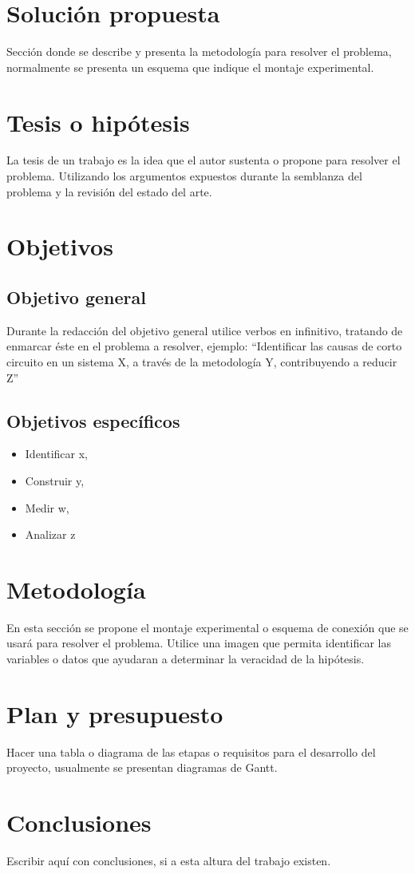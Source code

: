 \documentclass[a4paper, twocolumns]{IEEEtran}
\begin{document}
\section{Solución propuesta}
Sección donde se describe y presenta la metodología para resolver el problema,
normalmente se presenta un esquema que indique el montaje experimental.

\section{Tesis o hipótesis}
La tesis de un trabajo es la idea que el autor sustenta o propone para resolver
el problema. Utilizando los argumentos expuestos  durante la semblanza del
problema y la revisión del estado del arte.


\section{Objetivos}
\subsection{Objetivo general}
Durante la redacción del objetivo general utilice verbos en infinitivo,
tratando de enmarcar éste en el problema a resolver, ejemplo: ``Identificar las
causas de corto circuito en un sistema X, 
a través de  la metodología Y, contribuyendo  a reducir Z''

\subsection{Objetivos específicos}
\begin{itemize}
   \item  Identificar  x, 
   \item Construir y,
   \item Medir w, 
   \item Analizar  z
\end{itemize}
\section{Metodología}
En esta sección se propone el montaje experimental o esquema de conexión que se
usará para resolver el problema. Utilice una imagen que permita identificar las
variables o datos que ayudaran a determinar la veracidad de la hipótesis.  

\section{Plan y presupuesto}
Hacer una tabla o diagrama de las etapas o requisitos para el desarrollo del
proyecto, usualmente se presentan diagramas de Gantt\cite{mycite2016}.

\section{Conclusiones}
Escribir aquí con conclusiones, si a esta altura del trabajo existen. 



\end{document}
